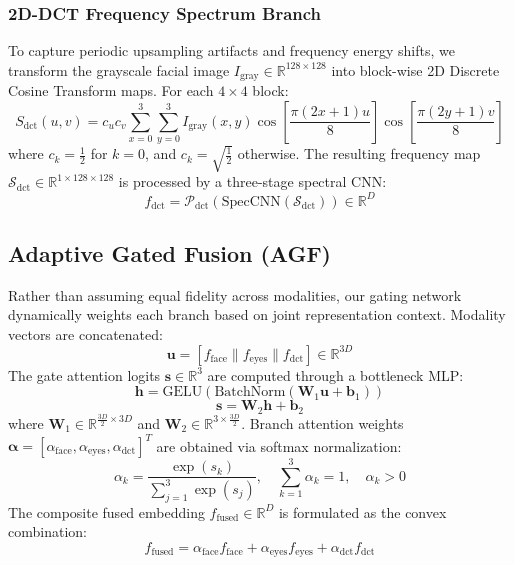 \documentclass[journal,10pt,twocolumn]{IEEEtran}
\begin{document}
\subsubsection{2D-DCT Frequency Spectrum Branch}
To capture periodic upsampling artifacts and frequency energy shifts, we transform the grayscale facial image $I_{\text{gray}} \in \mathbb{R}^{128 \times 128}$ into block-wise 2D Discrete Cosine Transform maps. For each $4\times 4$ block:
\begin{equation}
    S_{\text{dct}}(u, v) = c_u c_v \sum_{x=0}^{3} \sum_{y=0}^{3} I_{\text{gray}}(x, y) \cos\left[\frac{\pi (2x+1)u}{8}\right] \cos\left[\frac{\pi (2y+1)v}{8}\right]
\end{equation}
where $c_k = \frac{1}{2}$ for $k=0$, and $c_k = \sqrt{\frac{1}{2}}$ otherwise. The resulting frequency map $\mathcal{S}_{\text{dct}} \in \mathbb{R}^{1 \times 128 \times 128}$ is processed by a three-stage spectral CNN:
\begin{equation}
    f_{\text{dct}} = \mathcal{P}_{\text{dct}}(\text{SpecCNN}(\mathcal{S}_{\text{dct}})) \in \mathbb{R}^{D}
\end{equation}

\subsection{Adaptive Gated Fusion (AGF)}
Rather than assuming equal fidelity across modalities, our gating network dynamically weights each branch based on joint representation context. Modality vectors are concatenated:
\begin{equation}
    \mathbf{u} = [f_{\text{face}} \parallel f_{\text{eyes}} \parallel f_{\text{dct}}] \in \mathbb{R}^{3D}
\end{equation}
The gate attention logits $\mathbf{s} \in \mathbb{R}^3$ are computed through a bottleneck MLP:
\begin{equation}
    \mathbf{h} = \text{GELU}(\text{BatchNorm}(\mathbf{W}_1 \mathbf{u} + \mathbf{b}_1))
\end{equation}
\begin{equation}
    \mathbf{s} = \mathbf{W}_2 \mathbf{h} + \mathbf{b}_2
\end{equation}
where $\mathbf{W}_1 \in \mathbb{R}^{\frac{3D}{2} \times 3D}$ and $\mathbf{W}_2 \in \mathbb{R}^{3 \times \frac{3D}{2}}$. Branch attention weights $\boldsymbol{\alpha} = [\alpha_{\text{face}}, \alpha_{\text{eyes}}, \alpha_{\text{dct}}]^T$ are obtained via softmax normalization:
\begin{equation}
    \alpha_k = \frac{\exp(s_k)}{\sum_{j=1}^3 \exp(s_j)}, \quad \sum_{k=1}^3 \alpha_k = 1, \quad \alpha_k > 0
\end{equation}
The composite fused embedding $f_{\text{fused}} \in \mathbb{R}^D$ is formulated as the convex combination:
\begin{equation}
    f_{\text{fused}} = \alpha_{\text{face}} f_{\text{face}} + \alpha_{\text{eyes}} f_{\text{eyes}} + \alpha_{\text{dct}} f_{\text{dct}}
\end{equation}
\end{document}
